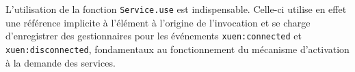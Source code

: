 L'utilisation de la fonction \texttt{Service.use} est indispensable. Celle-ci utilise en effet une référence implicite à l'élément à l'origine de l'invocation et se charge d'enregistrer des gestionnaires pour les événements \texttt{xuen:connected} et \texttt{xuen:disconnected}, fondamentaux au fonctionnement du mécanisme d'activation à la demande des services.
